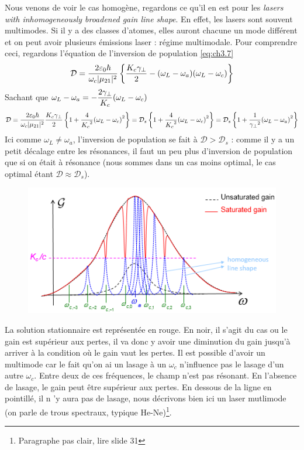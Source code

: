 Nous venons de voir le cas homogène, regardons ce qu'il en est pour les \textit{lasers with inhomogeneously broadened gain line shape}. En effet, les lasers sont souvent multimodes. Si 
il y a des classes d'atomes, elles auront chacune un mode différent et on peut avoir plusieurs 
émissions laser : régime multimodale. Pour comprendre ceci, regardons l'équation de l'inversion 
de population \eqref{eq:ch3.7}
\begin{equation}
{\cal D} = \frac{{2{\varepsilon _0}\hbar }}{{{\omega _c}|{\mu _{21}}{|^2}}}\left\{ {\frac{{{K_c}{\gamma _ \bot }}}{2} - ({\omega _L} - {\omega _a})({\omega _L} - {\omega _c})} \right\}
\end{equation}
Sachant que $\displaystyle \omega_L-\omega_a =-\frac{{2{\gamma _ \bot }}}{{{K_c}}}({\omega _L} - {\omega _c})$
\begin{equation}
{\cal D} = \frac{{2{\varepsilon _0}\hbar }}{{{\omega _c}|{\mu _{21}}{|^2}}}\frac{{{K_c}{\gamma _ \bot }}}{2}\left\{ {1 + \frac{4}{{{K_c}^2}}{{({\omega _L} - {\omega _c})}^2}} \right\} 
 = {{\cal D}_s}\left\{ {1 + \frac{4}{{{K_c}^2}}{{({\omega _L} - {\omega _c})}^2}} \right\} = {{\cal D}_s}\left\{ {1 + \frac{1}{{{\gamma _ \bot }^2}}{{({\omega _L} - {\omega _a})}^2}} \right\}
\end{equation}
Ici comme $\omega_L\neq\omega_a$, l'inversion de population se fait à $\mathcal{D}>\mathcal{D}_s$ : 
comme il y a un petit décalage entre les résonances, il faut un peu plus d'inversion de population 
que si on était à résonance (nous sommes dans un cas moins optimal, le cas optimal étant $\mathcal{D}\approx\mathcal{D}_s$).\\

	\begin{figure}
	\vspace{-5mm}
	\includegraphics[scale=0.75]{ch3/image14.png}
	\end{figure}
La solution stationnaire est représentée en rouge. En noir, il s'agit du cas ou le gain est 
supérieur aux pertes, il va donc y avoir une diminution du gain jusqu'à arriver à la condition où 
le gain vaut les pertes. Il est possible d'avoir un multimode car le fait qu'on ai un lasage à 
un $\omega_c$ n'influence pas le lasage d'un autre $\omega_c$. Entre deux de ces fréquences, 
le champ n'est pas résonant. En l'absence de lasage, le gain peut être supérieur aux pertes. En 
dessous de la ligne en pointillé, il n 'y aura pas de lasage, nous décrivons bien ici un laser 
mutlimode (on parle de trous spectraux, typique He-Ne)\footnote{Paragraphe pas clair, lire slide 31}.\\

